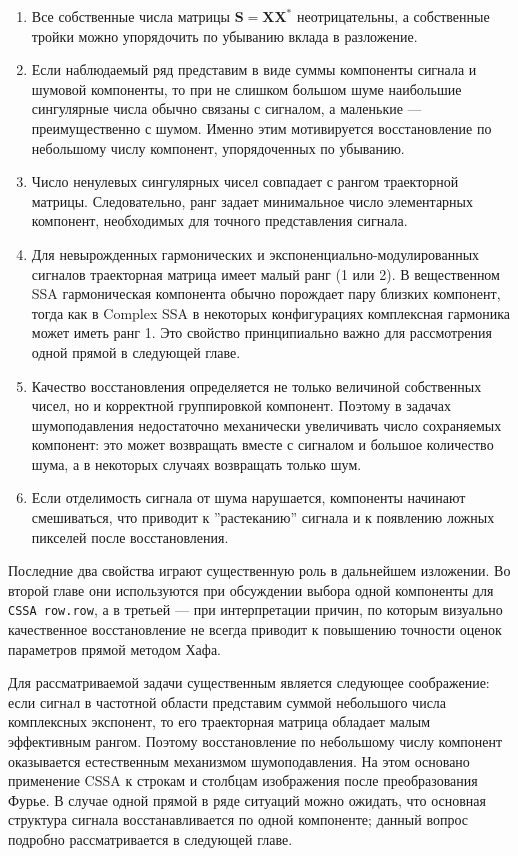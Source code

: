 \begin{enumerate}
	\item Все собственные числа матрицы $\mathbf{S}=\mathbf{X}\mathbf{X}^{*}$ неотрицательны, а собственные тройки можно упорядочить по убыванию вклада в разложение.
	\item Если наблюдаемый ряд представим в виде суммы компоненты сигнала и шумовой компоненты, то при не слишком большом шуме наибольшие сингулярные числа обычно связаны с сигналом, а маленькие --- преимущественно с шумом. Именно этим мотивируется восстановление по небольшому числу компонент, упорядоченных по убыванию.
	\item Число ненулевых сингулярных чисел совпадает с рангом траекторной матрицы. Следовательно, ранг задает минимальное число элементарных компонент, необходимых для точного представления сигнала.
	\item Для невырожденных гармонических и экспоненциально-модулированных сигналов траекторная матрица имеет малый ранг (1 или 2). В вещественном SSA гармоническая компонента обычно порождает пару близких компонент, тогда как в Complex SSA в некоторых конфигурациях комплексная гармоника может иметь ранг 1. Это свойство принципиально важно для рассмотрения одной прямой в следующей главе.
	\item Качество восстановления определяется не только величиной собственных чисел, но и корректной группировкой компонент. Поэтому в задачах шумоподавления недостаточно механически увеличивать число сохраняемых компонент: это может возвращать вместе с сигналом и большое количество шума, а в некоторых случаях возвращать только шум.
	\item Если отделимость сигнала от шума нарушается, компоненты начинают смешиваться, что приводит к ''растеканию'' сигнала и к появлению ложных пикселей после восстановления.
\end{enumerate}

Последние два свойства играют существенную роль в дальнейшем изложении. Во второй главе они используются при обсуждении выбора одной компоненты для \texttt{CSSA row.row}, а в третьей --- при интерпретации причин, по которым визуально качественное восстановление не всегда приводит к повышению точности оценок параметров прямой методом Хафа.

Для рассматриваемой задачи существенным является следующее соображение: если сигнал в частотной области представим суммой небольшого числа комплексных экспонент, то его траекторная матрица обладает малым эффективным рангом. Поэтому восстановление по небольшому числу компонент оказывается естественным механизмом шумоподавления. На этом основано применение CSSA к строкам и столбцам изображения после преобразования Фурье. В случае одной прямой в ряде ситуаций можно ожидать, что основная структура сигнала восстанавливается по одной компоненте; данный вопрос подробно рассматривается в следующей главе.

